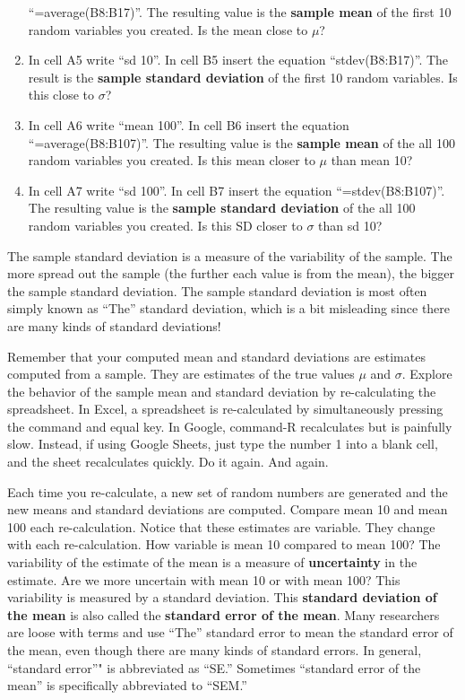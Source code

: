\documentclass[]{book}
\theoremstyle{definition}
\theoremstyle{definition}
\theoremstyle{definition}
\theoremstyle{remark}
\begin{document}
\begin{enumerate}
  ``=average(B8:B17)''. The resulting value is the \textbf{sample mean}
  of the first 10 random variables you created. Is the mean close to
  \(\mu\)?
\item
  In cell A5 write ``sd 10''. In cell B5 insert the equation
  ``stdev(B8:B17)''. The result is the \textbf{sample standard
  deviation} of the first 10 random variables. Is this close to
  \(\sigma\)?
\item
  In cell A6 write ``mean 100''. In cell B6 insert the equation
  ``=average(B8:B107)''. The resulting value is the \textbf{sample mean}
  of the all 100 random variables you created. Is this mean closer to
  \(\mu\) than mean 10?
\item
  In cell A7 write ``sd 100''. In cell B7 insert the equation
  ``=stdev(B8:B107)''. The resulting value is the \textbf{sample
  standard deviation} of the all 100 random variables you created. Is
  this SD closer to \(\sigma\) than sd 10?
\end{enumerate}

The sample standard deviation is a measure of the variability of the
sample. The more spread out the sample (the further each value is from
the mean), the bigger the sample standard deviation. The sample standard
deviation is most often simply known as ``The'' standard deviation,
which is a bit misleading since there are many kinds of standard
deviations!

Remember that your computed mean and standard deviations are estimates
computed from a sample. They are estimates of the true values \(\mu\)
and \(\sigma\). Explore the behavior of the sample mean and standard
deviation by re-calculating the spreadsheet. In Excel, a spreadsheet is
re-calculated by simultaneously pressing the command and equal key. In
Google, command-R recalculates but is painfully slow. Instead, if using
Google Sheets, just type the number 1 into a blank cell, and the sheet
recalculates quickly. Do it again. And again.

Each time you re-calculate, a new set of random numbers are generated
and the new means and standard deviations are computed. Compare mean 10
and mean 100 each re-calculation. Notice that these estimates are
variable. They change with each re-calculation. How variable is mean 10
compared to mean 100? The variability of the estimate of the mean is a
measure of \textbf{uncertainty} in the estimate. Are we more uncertain
with mean 10 or with mean 100? This variability is measured by a
standard deviation. This \textbf{standard deviation of the mean} is also
called the \textbf{standard error of the mean}. Many researchers are
loose with terms and use ``The'' standard error to mean the standard
error of the mean, even though there are many kinds of standard errors.
In general, ``standard error''" is abbreviated as ``SE.'' Sometimes
``standard error of the mean'' is specifically abbreviated to ``SEM.''
\end{document}
